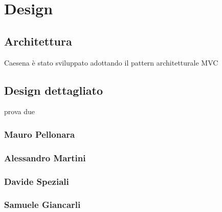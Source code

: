\section{Design}
\subsection{Architettura}
Caesena è stato sviluppato adottando il pattern architetturale MVC 
\subsection{Design dettagliato}
prova due
\subsubsection*{Mauro Pellonara} 

\subsubsection*{Alessandro Martini}

\subsubsection*{Davide Speziali}

\subsubsection*{Samuele Giancarli}